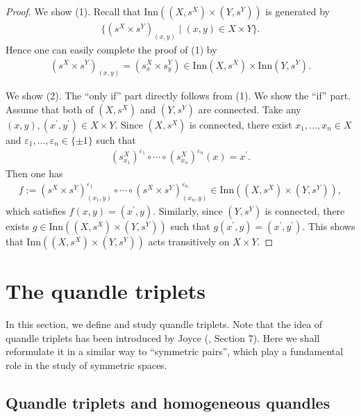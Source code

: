 \documentclass[12pt]{amsart}
\theoremstyle{definition}
\begin{document}
\begin{proof}
We show (1). Recall that $ {\mathrm{Inn}}((X,s^{X}) \times (Y,s^{Y})) $ is generated by
\begin{align*}
\{ (s^{X} \times s^{Y})_{(x,y)} \mid (x,y) \in X \times Y \}.
\end{align*}
Hence one can easily complete the proof of (1) by
\begin{align*}
(s^{X} \times s^{Y})_{(x,y)} = (s^{X}_{x} \times s^{Y}_{y}) \in {\mathrm{Inn}}(X,s^{X}) \times {\mathrm{Inn}}(Y,s^{Y}).
\end{align*}

We show (2). The ``only if'' part directly follows from (1). We show the ``if'' part. Assume that both of $ (X,s^{X}) $ and $ (Y,s^{Y}) $ are connected. Take any $ (x, y), (x^{\prime}, y^{\prime}) \in X \times Y $. Since $ (X,s^{X}) $ is connected, there exist $ x_{1}, \ldots, x_{n} \in X $ and $ \varepsilon_{1}, \ldots, \varepsilon_{n} \in \{ \pm1 \} $ such that
\begin{align*}
(s^{X}_{x_{1}})^{\varepsilon_{1}} \circ \cdots \circ (s^{X}_{x_{n}})^{\varepsilon_{n}}(x) = x^{\prime}.
\end{align*}
Then one has
\begin{align*}
f:= (s^{X} \times s^{Y})_{(x_{1},y)}^{\varepsilon_{1}} \circ \cdots \circ (s^{X} \times s^{Y})_{(x_{n},y)}^{\varepsilon_{n}} \in {\mathrm{Inn}}((X,s^{X}) \times (Y,s^{Y})),
\end{align*}
which satisfies $ f(x,y) = (x^{\prime},y) $. Similarly, since $ (Y,s^{Y}) $ is connected, there exists $ g \in {\mathrm{Inn}}((X,s^{X}) \times (Y,s^{Y})) $ such that $ g(x^{\prime},y) = (x^{\prime},y^{\prime}) $. This shows that $ {\mathrm{Inn}}((X,s^{X}) \times (Y,s^{Y})) $ acts transitively on $ X \times Y $.
\end{proof}

\section{The quandle triplets}\label{sec3}

In this section, we define and study quandle triplets. Note that the idea of quandle triplets has been introduced by Joyce (\cite{Joyce}, Section 7). Here we shall reformulate it in a similar way to ``symmetric pairs'', which play a fundamental role in the study of symmetric spaces.

\subsection{Quandle triplets and homogeneous quandles}
\end{document}
